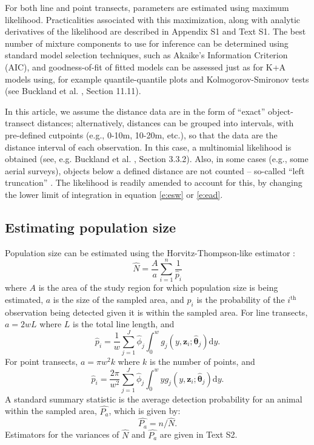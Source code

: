 \documentclass[10pt]{article}
\begin{document}
For both line and point transects, parameters are estimated using maximum likelihood. Practicalities associated with this maximization, along with analytic derivatives of the likelihood are described in Appendix S1 and Text S1.  The best number of mixture components to use for inference can be determined using standard model selection techniques, such as Akaike's Information Criterion (AIC), and goodness-of-fit of fitted models can be assessed just as for K+A models using, for example quantile-quantile plots and Kolmogorov-Smironov tests (see Buckland et al. \cite{Buckland:2004ts}, Section 11.11).

In this article, we assume the distance data are in the form of ``exact'' object-transect distances; alternatively, distances can be grouped into intervals, with pre-defined cutpoints (e.g., 0-10m, 10-20m, etc.), so that the data are the distance interval of each observation.  In this case, a multinomial likelihood is obtained (see, e.g. Buckland et al. \cite{Buckland:2001vm}, Section 3.3.2).  Also, in some cases (e.g., some aerial surveys), objects below a defined distance are not counted -- so-called ``left truncation'' \cite[Section 4.3.2]{Buckland:2001vm}.  The likelihood is readily amended to account for this, by changing the lower limit of integration in equation \eqref{e:esw} or \eqref{e:ead}.

\subsection*{Estimating population size}

Population size can be estimated using the Horvitz-Thompson-like estimator \cite{Marques:2003vb}:
\begin{equation}
\label{e:popsize}
\hat{N}=\frac{A}{a}\sum_{i=1}^n \frac{1}{\hat {p}_i}
\end{equation}
where $A$ is the area of the study region for which population size is being estimated, $a$ is the size of the sampled area, and $p_i$ is the probability of the $i^\text{th}$ observation being detected given it is within the sampled area.  For line transects, $a=2wL$ where $L$ is the total line length, and 
\begin{equation*}
\hat{p}_i = \frac{1}{w} \sum_{j=1}^J \hat{\phi}_j \int_0^w  g_j(y,\mathbf{z}_{i}; \boldsymbol{\hat{\theta}}_j) \text{d}y.
\end{equation*}
For point transects, $a=\pi w^2 k$ where $k$ is the number of points, and 
\begin{equation*}
\hat{p}_i = \frac{2\pi}{w^2} \sum_{j=1}^J \hat{\phi}_j \int_0^w  y g_j(y,\mathbf{z}_{i}; \boldsymbol{\hat{\theta}
}_j) \text{d}y.
\end{equation*}
A standard summary statistic is the average detection probability for an animal within the sampled area, $\hat{P_a}$, which is given by:
\begin{equation*}
\hat{P_a} = n/\hat{N}.
\end{equation*}
Estimators for the variances of $\hat{N}$ and $\hat{P_a}$ are given in Text S2.
\end{document}
